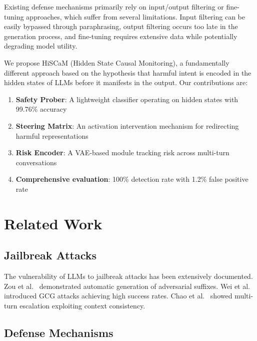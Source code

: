 \documentclass[10pt,twocolumn]{article}
\newcommand{\method}{HiSCaM}  %
\begin{document}
Existing defense mechanisms primarily rely on input/output filtering or fine-tuning approaches, which suffer from several limitations. Input filtering can be easily bypassed through paraphrasing, output filtering occurs too late in the generation process, and fine-tuning requires extensive data while potentially degrading model utility.

We propose \method{} (Hidden State Causal Monitoring), a fundamentally different approach based on the hypothesis that harmful intent is encoded in the hidden states of LLMs before it manifests in the output. Our contributions are:

\begin{enumerate}
\item \textbf{Safety Prober}: A lightweight classifier operating on hidden states with 99.76\% accuracy
\item \textbf{Steering Matrix}: An activation intervention mechanism for redirecting harmful representations
\item \textbf{Risk Encoder}: A VAE-based module tracking risk across multi-turn conversations
\item \textbf{Comprehensive evaluation}: 100\% detection rate with 1.2\% false positive rate
\end{enumerate}

\section{Related Work}

\subsection{Jailbreak Attacks}

The vulnerability of LLMs to jailbreak attacks has been extensively documented. Zou et al.~\cite{zou2023universal} demonstrated automatic generation of adversarial suffixes. Wei et al.~\cite{wei2023jailbroken} introduced GCG attacks achieving high success rates. Chao et al.~\cite{chao2023jailbreaking} showed multi-turn escalation exploiting context consistency.

\subsection{Defense Mechanisms}
\end{document}
